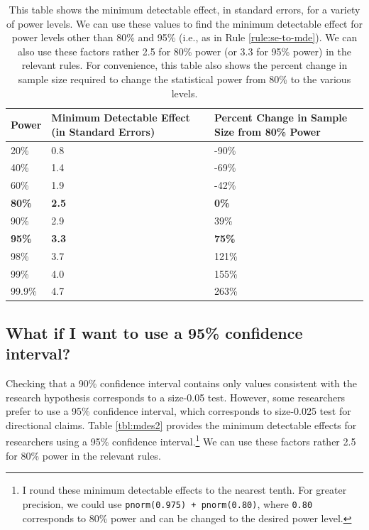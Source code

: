 \documentclass[12pt]{article}
\begin{document}
\begin{table}[h]
\centering 
\caption{This table shows the minimum detectable effect, in standard errors, for a variety of power levels. We can use these values to find the minimum detectable effect for power levels other than 80\% and 95\% (i.e., as in Rule \ref{rule:se-to-mde}). We can also use these factors rather 2.5 for 80\% power (or 3.3 for 95\% power) in the relevant rules. For convenience, this table also shows the percent change in sample size required to change the statistical power from 80\% to the various levels.}\label{tbl:mdes}
\footnotesize %
\renewcommand{\tabularxcolumn}[1]{>{\centering\arraybackslash}m{#1}} %
\setlength{\extrarowheight}{4pt} %
\begin{tabularx}{\linewidth}{|X|X|X|} %
\hline
\textbf{Power} & \textbf{Minimum Detectable Effect (in Standard Errors)} & \textbf{Percent Change in Sample Size from 80\% Power} \\
\hline
20\%   & 0.8 & -90\% \\
\hline
40\%   & 1.4 & -69\% \\
\hline
60\%   & 1.9 & -42\% \\
\hline
\textbf{80\%}   & \textbf{2.5} & \textbf{0\%} \\
\hline
90\%   & 2.9 & 39\% \\
\hline
\textbf{95\%}   & \textbf{3.3} & \textbf{75\%} \\
\hline
98\%   & 3.7 & 121\% \\
\hline
99\%   & 4.0 & 155\% \\
\hline
99.9\%  & 4.7 & 263\% \\
\hline
\end{tabularx}
\end{table}

\subsection*{What if I want to use a 95\% confidence interval?}

Checking that a 90\% confidence interval contains only values consistent with the research hypothesis corresponds to a size-0.05 test. 
However, some researchers prefer to use a 95\% confidence interval, which corresponds to size-0.025 test for directional claims. 
Table \ref{tbl:mdes2} provides the minimum detectable effects for researchers using a 95\% confidence interval.\footnote{
  I round these minimum detectable effects to the nearest tenth. 
  For greater precision, we could use \texttt{pnorm(0.975) + pnorm(0.80)}, where \texttt{0.80} corresponds to 80\% power and can be changed to the desired power level.
  } 
We can use these factors rather 2.5 for 80\% power in the relevant rules. 
\end{document}
